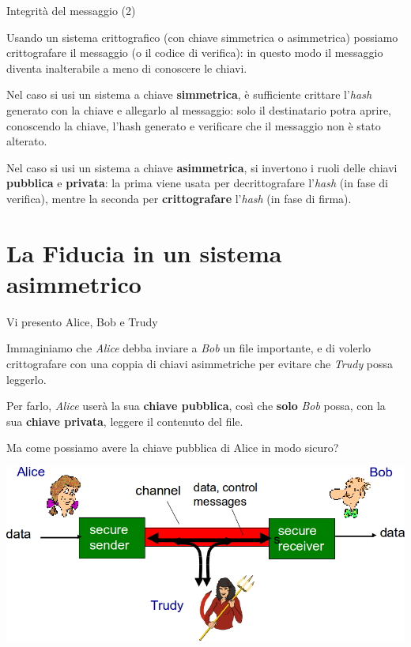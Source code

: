 \documentclass[10pt]{beamer}
\begin{document}
\begin{frame}{Integrità del messaggio (2)}

Usando un sistema crittografico (con chiave simmetrica o asimmetrica) possiamo crittografare il messaggio (o il codice di verifica): in questo modo il messaggio diventa inalterabile a meno di conoscere le chiavi.

Nel caso si usi un sistema a chiave \textbf{simmetrica}, è sufficiente crittare l'\textit{hash} generato con la chiave e allegarlo al messaggio: solo il destinatario potra aprire, conoscendo la chiave, l'hash generato e verificare che il messaggio non è stato alterato.

Nel caso si usi un sistema a chiave \textbf{asimmetrica}, si invertono i ruoli delle chiavi \textbf{pubblica} e \textbf{privata}: la prima viene usata per decrittografare l'\textit{hash} (in fase di verifica), mentre la seconda per \textbf{crittografare} l'\textit{hash} (in fase di firma).

\end{frame}

\section{La Fiducia in un sistema asimmetrico}

\begin{frame}{Vi presento Alice, Bob e Trudy}

Immaginiamo che \textit{Alice} debba inviare a \textit{Bob} un file importante, e di volerlo crittografare con una coppia di chiavi asimmetriche per evitare che \textit{Trudy} possa leggerlo.

Per farlo, \textit{Alice} userà la sua \textbf{chiave pubblica}, così che \textbf{solo} \textit{Bob} possa, con la sua \textbf{chiave privata}, leggere il contenuto del file.

Ma come possiamo avere la chiave pubblica di Alice in modo sicuro?

\centering
\includegraphics[scale=0.4]{1-alice-bob-trudy}

\end{frame}
\end{document}

